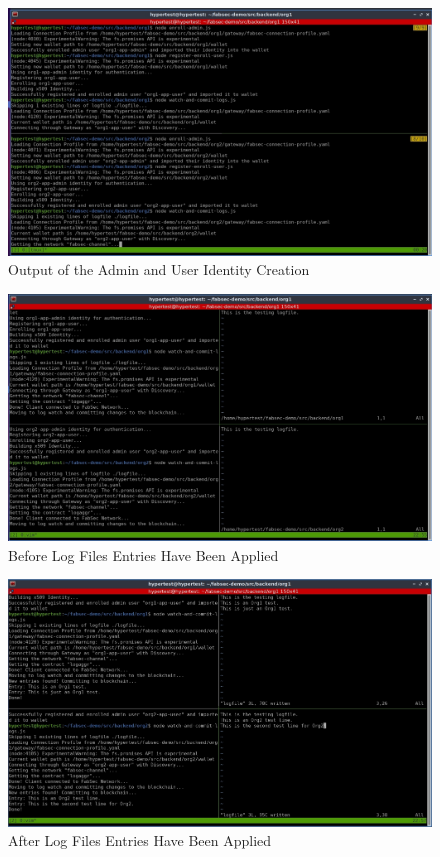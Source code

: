 		\begin{figure}[H]
		\includegraphics[width=.9\textwidth]{./fabsec-report-network-flow/network-flow-16.jpg}
		\centering
		\caption{Output of the Admin and User Identity Creation}
		\end{figure}
		
		\begin{figure}[H]
		\includegraphics[width=.9\textwidth]{./fabsec-report-network-flow/network-flow-17.jpg}
		\centering
		\caption{Before Log Files Entries Have Been Applied}
		\end{figure}
		
		\begin{figure}[H]
		\includegraphics[width=.9\textwidth]{./fabsec-report-network-flow/network-flow-18.jpg}
		\centering
		\caption{After Log Files Entries Have Been Applied}
		\end{figure}	
		

